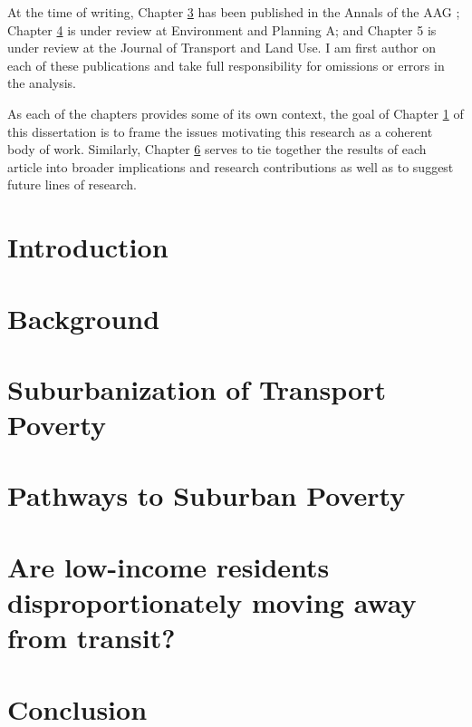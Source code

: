 \documentclass[11 pt, letterpaper]{report}
\begin{document}
At the time of writing, Chapter \ref{ch:subtrapov} has been published in the Annals of the AAG \cite{allen_suburbanization_2021}; Chapter \ref{ch:pathsubpov} is under review at Environment and Planning A; and Chapter 5 is under review at the Journal of Transport and Land Use. I am first author on each of these publications and take full responsibility for omissions or errors in the analysis. 

As each of the chapters provides some of its own context, the goal of Chapter \ref{ch:intro} of this dissertation is to frame the issues motivating this research as a coherent body of work. Similarly, Chapter \ref{ch:conc} serves to tie together the results of each article into broader implications and research contributions as well as to suggest future lines of research. 



\newpage


\renewcommand{\thepage}{\arabic{page}}%
\setcounter{page}{1}


\chapter{{Introduction}}


\label{ch:intro}


\chapter{Background}
\label{ch:background}




\chapter{Suburbanization of Transport Poverty}
\label{ch:subtrapov}




\chapter{Pathways to Suburban Poverty}
\label{ch:pathsubpov}



\chapter{Are low-income residents disproportionately moving away from transit?}
\label{ch:lowinctra}





\chapter{Conclusion}
\label{ch:conc}








\end{document}
